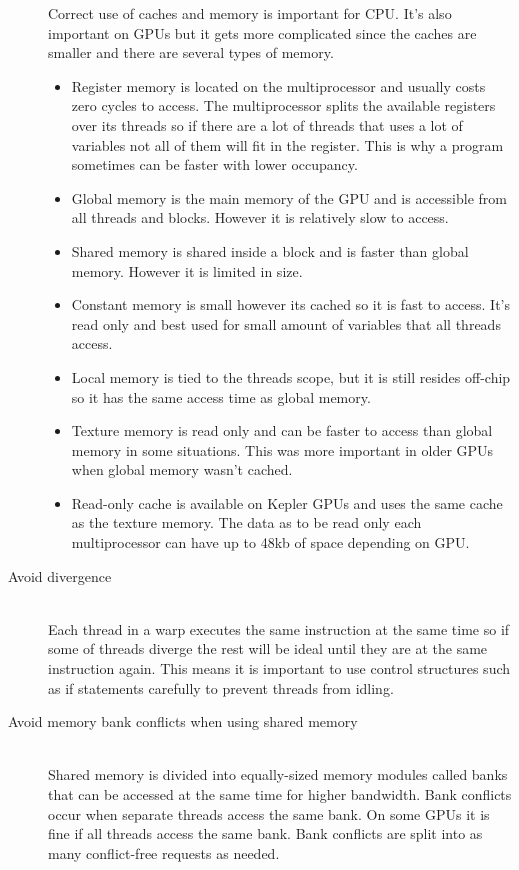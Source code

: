 \documentclass[10pt,a4paper]{report}
\begin{document}
\begin{description}
  Correct use of caches and memory is important for CPU\cite{drepper2007cpumemory}. It's also important on GPUs but it gets more complicated since the caches are smaller and there are several types of memory.
    \begin{itemize}
    \item Register memory is located on the multiprocessor and usually costs zero cycles to access. The multiprocessor splits the available registers over its threads so if there are a lot of threads that uses a lot of variables not all of them will fit in the register. This is why a program sometimes can be faster with lower occupancy.
    \item Global memory is the main memory of the GPU and is accessible from all threads and blocks. However it is relatively slow to access.
    \item Shared memory is shared inside a block and is faster than global memory. However it is limited in size.
    \item Constant memory is small however its cached so it is fast to access. It's read only and best used for small amount of variables that all threads access.
    \item Local memory is tied to the threads scope, but it is still resides off-chip so it has the same access time as global memory.
    \item Texture memory is read only and can be faster to access than global memory in some situations. This was more important in older GPUs when global memory wasn't cached.\cite{plink_gpu, cuda}
    \item Read-only cache is available on Kepler GPUs and uses the same cache as the texture memory. The data as to be read only each multiprocessor can have up to 48kb of space depending on GPU.\cite{kepler_tuning_guide}
  \end{itemize}
  \item[Avoid divergence] \hfill \\
  Each thread in a warp executes the same instruction at the same time so if some of threads diverge the rest will be ideal until they are at the same instruction again. This means it is important to use control structures such as if statements carefully to prevent threads from idling.\cite{cuda, cuda_best_practice}
  \item[Avoid memory bank conflicts when using shared memory] \hfill \\
  Shared memory is divided into equally-sized memory modules called banks that can be accessed at the same time for higher bandwidth. Bank conflicts occur when separate threads access the same bank. On some GPUs it is fine if all threads access the same bank. Bank conflicts are split into as many conflict-free requests as needed.\cite{cuda, cuda_best_practice}

\end{description}
\end{document}
